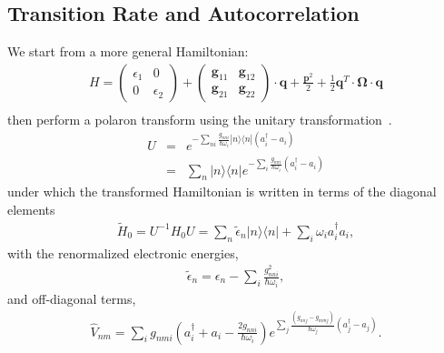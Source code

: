\subsection{Transition Rate and Autocorrelation}
We start from a more general Hamiltonian:
\begin{eqnarray}
H=\left(\begin{array}{cc}
\epsilon_{1} & 0\\
0 & \epsilon_{2}
\end{array}\right)+\left(\begin{array}{cc}
{\mathbf g}_{11}&{\mathbf g}_{12} \\
{\mathbf g}_{21} &{\mathbf g}_{22}
\end{array}\right)\cdot{\mathbf q} +\frac{{\mathbf p}^{2}}{2}+\frac{1}{2}\mathbf{q}^{T}\cdot\mathbf\Omega\cdot\mathbf{q}
\nonumber \\
\label{ham1}
\end{eqnarray}
then perform a polaron transform
using the unitary transformation~\cite{grover1970exciton,rice1994excitons,pereverzev2006time}.
\begin{eqnarray}
U&=&e^{-\sum_{ni}\!\!\frac{g_{nni}}{\hbar\omega_i}|n\rangle \langle
n|(a^{\dagger}_i-a_i)}
 \nonumber \\
&=&
\sum_{n}|n\rangle \langle n|e^{-\sum_{i}\!\!\frac{g_{nni}}{\hbar\omega_i}(a^{\dagger}_i-a_i)}
\label{unitary}
\end{eqnarray}
under which the transformed Hamiltonian is written in terms of the
diagonal elements
\begin{eqnarray} \tilde H_0=U^{-1}H_0U
=\sum_n\tilde\epsilon_n |n\rangle \langle
n|+\sum_i\omega_ia^{\dagger}_ia_i,
 \end{eqnarray}
with  the renormalized electronic energies,
\begin{eqnarray}
\tilde\epsilon_n=\epsilon_n-\sum_{i}\frac{g_{nni}^2}{\hbar\omega_i},
\end{eqnarray}
and off-diagonal terms,
\begin{eqnarray} \hat V_{nm}=\sum_{i}g_{nmi}\left(a^{\dagger}_i+
a_i-\frac{2g_{nni}}{\hbar\omega_i}\right)e^{\sum_{j}\frac{(g_{nnj}-g_{mmj})}{\hbar\omega_j}(a^{\dagger}_j-a_j)}.
\label{opm}
\end{eqnarray}
